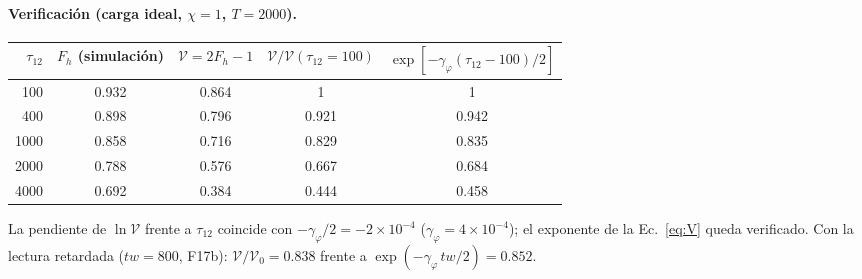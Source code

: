 \documentclass[11pt,a4paper]{article}
\newcommand{\gphi}{\gamma_\varphi}
\begin{document}
\paragraph{Verificación (carga ideal, $\chi=1$, $T=2000$).}
\begin{center}\small
\begin{tabular}{rcccc}\toprule
$\tau_{12}$ & $F_h$ (simulación) & $\mathcal V=2F_h-1$ & $\mathcal V/\mathcal V(\tau_{12}{=}100)$ & $\exp[-\gphi(\tau_{12}-100)/2]$\\\midrule
100  & 0.932 & 0.864 & 1     & 1\\
400  & 0.898 & 0.796 & 0.921 & 0.942\\
1000 & 0.858 & 0.716 & 0.829 & 0.835\\
2000 & 0.788 & 0.576 & 0.667 & 0.684\\
4000 & 0.692 & 0.384 & 0.444 & 0.458\\\bottomrule
\end{tabular}
\end{center}
La pendiente de $\ln\mathcal V$ frente a $\tau_{12}$ coincide con $-\gphi/2=-2\times10^{-4}$ ($\gphi=4\times10^{-4}$); el exponente de la Ec.~\eqref{eq:V} queda verificado.
Con la lectura retardada ($tw=800$, F17b): $\mathcal V/\mathcal V_0=0.838$ frente a $\exp(-\gphi\,tw/2)=0.852$.
\end{document}
